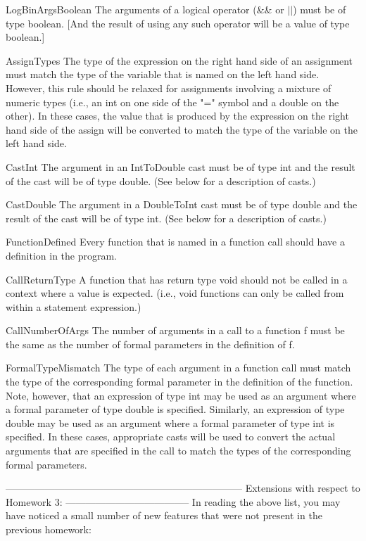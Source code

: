 \documentclass{article}
\begin{document}
LogBinArgsBoolean
  The arguments of a logical operator (\&\& or $|$$|$) must be of type
  boolean.  [And the result of using any such operator will be a
  value of type boolean.]

AssignTypes
  The type of the expression on the right hand side of an
  assignment must match the type of the variable that is named on
  the left hand side.  However, this rule should be relaxed for
  assignments involving a mixture of numeric types (i.e., an int
  on one side of the "=" symbol and a double on the other).  In
  these cases, the value that is produced by the expression on
  the right hand side of the assign will be converted to match
  the type of the variable on the left hand side.

CastInt
  The argument in an IntToDouble cast must be of type int and the
  result of the cast will be of type double.  (See below for a
  description of casts.)

CastDouble
  The argument in a DoubleToInt cast must be of type double and
  the result of the cast will be of type int.  (See below for a
  description of casts.)

FunctionDefined
  Every function that is named in a function call should have a
  definition in the program.

CallReturnType
  A function that has return type void should not be called in a
  context where a value is expected.  (i.e., void functions can
  only be called from within a statement expression.)

CallNumberOfArgs
  The number of arguments in a call to a function f must be the
  same as the number of formal parameters in the definition of f.

FormalTypeMismatch
  The type of each argument in a function call must match the type
  of the corresponding formal parameter in the definition of the
  function.  Note, however, that an expression of type int may be
  used as an argument where a formal parameter of type double is
  specified.  Similarly, an expression of type double may be used
  as an argument where a formal parameter of type int is
  specified.  In these cases, appropriate casts will be used to
  convert the actual arguments that are specified in the call
  to match the types of the corresponding formal parameters.

------------------------------------------------------------------------
Extensions with respect to Homework 3:
--------------------------------------
In reading the above list, you may have noticed a small number of
new features that were not present in the previous homework:
\end{document}
